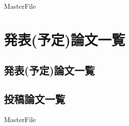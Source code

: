 \expandafter\ifx\csname MasterFile\endcsname\relax
\def\SubFile{hoge}


\fi

\cleardoublepage
\chapter{発表(予定)論文一覧}

\section{発表(予定)論文一覧}

\section{投稿論文一覧}

\clearpage
\expandafter\ifx\csname MasterFile\endcsname\relax

\fi
